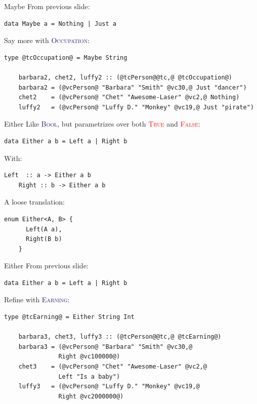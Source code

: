 \documentclass[xcolor={usenames,dvipsnames}]{beamer}
\newcommand{\htycon}[1]{\textcolor{MidnightBlue}{\textsc{#1}}}
\newcommand{\hvalcon}[1]{\textcolor{Red}{\textsc{#1}}}
\begin{document}
\begin{frame}[fragile]{Maybe}
  From previous slide:
  \begin{lstlisting}[style=hask]
    data Maybe a = Nothing | Just a
  \end{lstlisting}

  Say more with \htycon{Occupation}:
  \begin{lstlisting}[style=hask]
    type @tcOccupation@ = Maybe String

    barbara2, chet2, luffy2 :: (@tcPerson@@tc,@ @tcOccupation@)
    barbara2 = (@vcPerson@ "Barbara" "Smith" @vc30,@ Just "dancer")
    chet2    = (@vcPerson@ "Chet" "Awesome-Laser" @vc2,@ Nothing)
    luffy2   = (@vcPerson@ "Luffy D." "Monkey" @vc19,@ Just "pirate")
  \end{lstlisting}
\end{frame}

\begin{frame}[fragile]{Either}
  Like \htycon{Bool}, but parametrizes over both \hvalcon{True} and \hvalcon{False}:
  \begin{lstlisting}[style=hask]
    data Either a b = Left a | Right b
  \end{lstlisting}

  With:
  \begin{lstlisting}[style=hask]
    Left  :: a -> Either a b
    Right :: b -> Either a b
  \end{lstlisting}

  A loose translation:
  \begin{lstlisting}[style=hask]
    enum Either<A, B> {
      Left(A a),
      Right(B b)
    }
  \end{lstlisting}
\end{frame}

\begin{frame}[fragile]{Either}
  From previous slide:
  \begin{lstlisting}[style=hask]
    data Either a b = Left a | Right b
  \end{lstlisting}

  Refine with \htycon{Earning}:
  \begin{lstlisting}[style=hask]
    type @tcEarning@ = Either String Int

    barbara3, chet3, luffy3 :: (@tcPerson@@tc,@ @tcEarning@)
    barbara3 = (@vcPerson@ "Barbara" "Smith" @vc30,@
               Right @vc100000@)
    chet3    = (@vcPerson@ "Chet" "Awesome-Laser" @vc2,@
               Left "Is a baby") 
    luffy3   = (@vcPerson@ "Luffy D." "Monkey" @vc19,@
               Right @vc2000000@)
  \end{lstlisting}
\end{frame}
\end{document}
